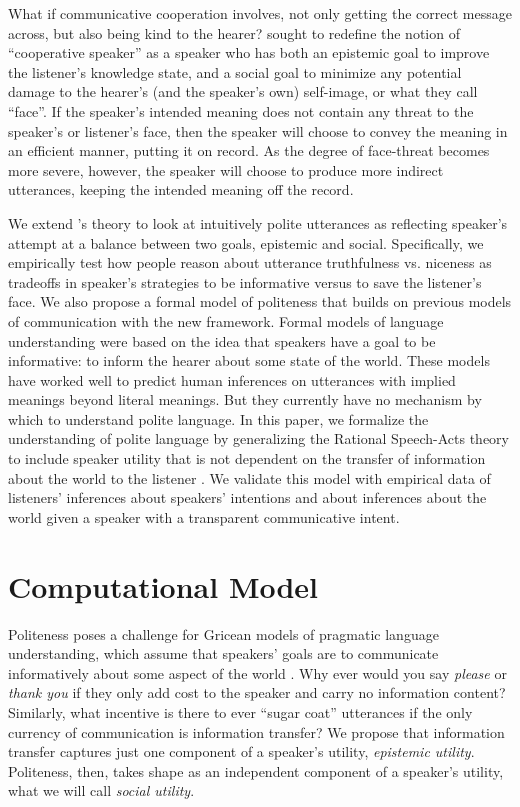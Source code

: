 \documentclass[10pt,letterpaper]{article}
\begin{document}
What if communicative cooperation involves, not only getting the correct message across, but also being kind to the hearer? 
 sought to redefine the notion of ``cooperative speaker'' as a speaker 
who has both an epistemic goal to improve the listener's knowledge state, 
and a social goal to minimize any potential damage to the hearer's (and the speaker's own) self-image, or what they call ``face''.
If the speaker's intended meaning does not contain any threat to the speaker's or listener's face, 
then the speaker will choose to convey the meaning in an efficient manner, putting it on record. 
As the degree of face-threat becomes more severe, however, 
the speaker will choose to produce more indirect utterances, keeping the intended meaning off the record.

We extend 's theory to look at intuitively polite utterances as reflecting speaker's attempt at a balance between two goals, epistemic and social. 
Specifically, we empirically test how people reason about utterance truthfulness vs. niceness 
as tradeoffs in speaker's strategies to be informative versus to save the listener's face. 
We also propose a formal model of politeness that builds on previous models of communication with the new framework.
Formal models of language understanding were based on the idea that
speakers have a goal to be informative: to inform the hearer about some state of the world.
These models have worked well to predict human inferences on utterances with implied meanings beyond literal meanings.
But they currently have no mechanism by which to understand polite language.
In this paper, we formalize the understanding of polite language by generalizing the Rational Speech-Acts theory 
to include speaker utility that is not dependent on the transfer of information about the world to the listener \cite{Frank2012, Goodman2013}.
We validate this model with empirical data of listeners' inferences about speakers' intentions and about inferences about the world given a speaker with a transparent communicative intent. 

\section{Computational Model}

Politeness poses a challenge for Gricean models of pragmatic language understanding, which assume that speakers' goals are to communicate informatively about some aspect of the world \cite{Frank2012, Goodman2013}. 
Why ever would you say \emph{please} or \emph{thank you} if they only add cost to the speaker and carry no information content?
Similarly, what incentive is there to ever ``sugar coat'' utterances if the only currency of communication is information transfer? 
We propose that information transfer captures just one component of a speaker's utility, \emph{epistemic utility}.
Politeness, then, takes shape as an independent component of a speaker's utility, what we will call \emph{social utility}. 
\end{document}
